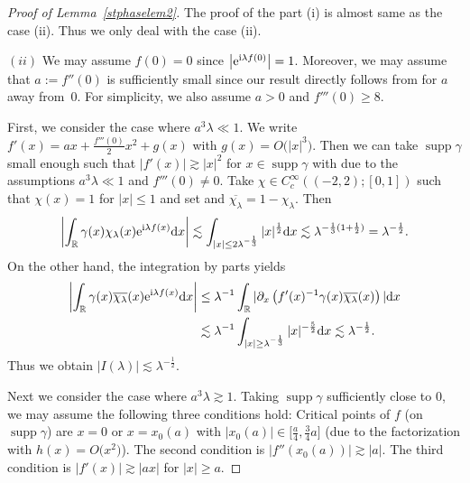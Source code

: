 \documentclass[pdftex]{sigma}
\numberwithin{equation}{section}
\def\R{\mathbb{R}}%
\DeclareMathOperator{\supp}{supp}%
\def\c{\gamma}
\def\l{\lambda}
\def\pa{\partial}
\begin{document}
\begin{proof}[Proof of Lemma~\ref{stphaselem2}]
The proof of the part (i) is almost same as the case (ii). Thus we only deal with the case (ii).

$(ii)$ We may assume $f(0)=0$ since $\big|{\rm e}^{{\rm i}\l f(0)}\big|=1$. Moreover, we may assume that $a:=f''(0)$ is sufficiently small since our result directly follows from \cite[p.334, Corollary]{S} for $a$ away from~$0$. For simplicity, we also assume $a>0$ and $f'''(0)\geq 8$.


First, we consider the case where $a^3\l\ll 1$. We write $f'(x)=ax+\frac{f'''(0)}{2}x^2+g(x)$ with ${g(x)=O\bigl(|x|^3\bigr)}$. Then we can take $\supp \c$ small enough such that $|f'(x)|\gtrsim |x|^2$ for $x\in \supp \c$ with \smash{$|x|\geq \l^{-\frac{1}{3}}$} due to the assumptions $a^3\l\ll 1$ and $f'''(0)\neq 0$.
Take $\chi\in C_c^{\infty}((-2,2);[0,1])$ such that $\chi(x)=1$ for $|x|\leq 1$ and set \smash{$\chi_{\l}(x)=\chi\bigl(\l^{\frac{1}{3}}xv)$} and $\overline{\chi_{\l}}=1-\chi_{\l}$. Then
\[
\left|\int_{\R}\c(x)\chi_{\l}(x){\rm e}^{{\rm i}\l f(x)}{\rm d}x\right|\lesssim \int_{|x|\leq 2\l^{-\frac{1}{3}}}|x|^{\frac{1}{2}} {\rm d}x\lesssim \l^{-\frac{1}{3}(1+\frac{1}{2})}=\l^{-\frac{1}{2}}.
\]
 On the other hand, the integration by parts yields
\begin{align*}
\left|\int_{\R}\c(x)\overline{\chi_{\l}}(x){\rm e}^{{\rm i}\l f(x)}{\rm d}x\right|&\leq \l^{-1}\int_{\R}|\pa_x\left(f'(x)^{-1}\c(x)\overline{\chi_{\l}}(x) \right)|{\rm d}x\\
&\lesssim \l^{-1}\int_{|x|\geq \l^{-\frac{1}{3}}}|x|^{-\frac{5}{2}}{\rm d}x\lesssim \l^{-\frac{1}{2}}.
\end{align*}
Thus we obtain $|I(\l)|\lesssim \l^{-\frac{1}{2}}$.

Next we consider the case where $a^3\l\gtrsim 1$. Taking $\supp \c$ sufficiently close to $0$, we may assume the following three conditions hold: Critical points of $f$ (on $\supp \c$) are $x=0$ or $x=x_0(a)$ with ${|x_0(a)|\in \bigl[\frac{a}{4}, \frac{3}{4}a\bigr]}$ \big(due to the factorization  with $h(x)=O\bigl(x^2\bigr)$\big). The second condition is $|f''(x_0(a))|\gtrsim |a|$. The third condition is $|f'(x)|\gtrsim |ax|$ for $|x|\geq a$.


\end{proof}
\end{document}
